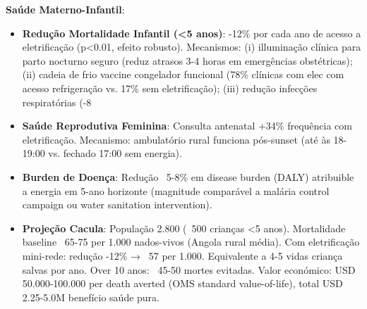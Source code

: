 \documentclass[12pt, a4paper]{article}
\begin{document}
\textbf{Saúde Materno-Infantil}: 
\begin{itemize}
\item \textbf{Redução Mortalidade Infantil (<5 anos)}: -12\% por cada ano de acesso a eletrificação (p<0.01, efeito robusto). Mecanismos: (i) illuminação clínica para parto nocturno seguro (reduz atrasos 3-4 horas em emergências obstétricas); (ii) cadeia de frio vaccine congelador funcional (78\% clínicas com elec com acesso refrigeração vs. 17\% sem eletrificação); (iii) redução infecções respiratórias (-8%
\item \textbf{Saúde Reprodutiva Feminina}: Consulta antenatal +34\% frequência com eletrificação. Mecanismo: ambulatório rural funciona pós-sunset (até às 18-19:00 vs. fechado 17:00 sem energia).
\item \textbf{Burden de Doença}: Redução ~5-8\% em disease burden (DALY) atribuible a energia em 5-ano horizonte (magnitude comparável a malária control campaign ou water sanitation intervention).
\item \textbf{Projeção Cacula}: População 2.800 (~500 crianças <5 anos). Mortalidade baseline ~65-75 per 1.000 nados-vivos (Angola rural média). Com eletrificação mini-rede: redução -12\% → ~57 per 1.000. Equivalente a 4-5 vidas criança salvas por ano. Over 10 anos: ~45-50 mortes evitadas. Valor económico: USD 50.000-100.000 per death averted (OMS standard value-of-life), total USD 2.25-5.0M benefício saúde pura.
\end{itemize}
\end{document}
